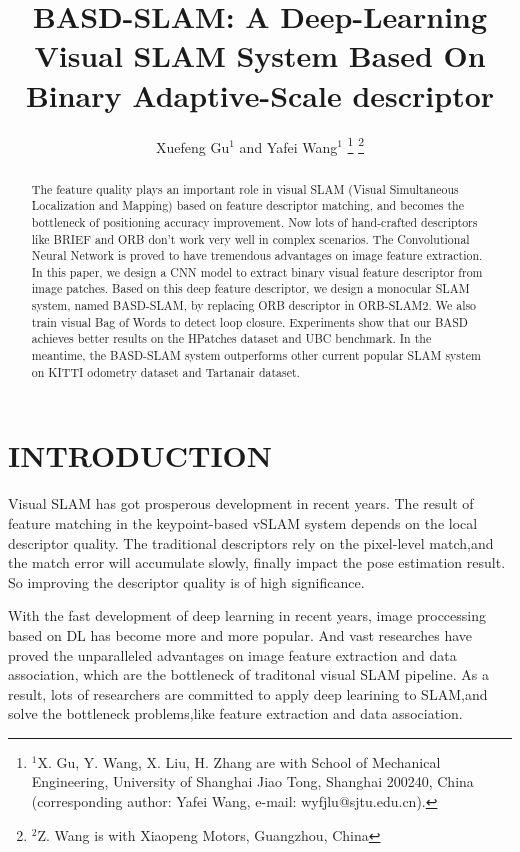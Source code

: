 \documentclass[letterpaper, 10 pt, conference]{ieeeconf}  %
\title{\LARGE \bf
BASD-SLAM: A Deep-Learning Visual SLAM System Based On Binary Adaptive-Scale descriptor
}
\author{Xuefeng Gu$^{1}$ and Yafei Wang$^{1}$ %
\thanks{$^{1}$X. Gu,  Y. Wang, X. Liu, H. Zhang are with School of Mechanical Engineering, University of Shanghai Jiao Tong, Shanghai 200240,
China (corresponding author: Yafei Wang, e-mail: wyfjlu@sjtu.edu.cn).
}
\thanks{
$^{2}$Z. Wang is with Xiaopeng Motors, Guangzhou, China}
%
}
\begin{document}
\maketitle
\thispagestyle{empty}
\pagestyle{empty}


\begin{abstract}

The feature quality plays an important role in visual SLAM (Visual Simultaneous Localization and Mapping) based on feature descriptor matching, and becomes the bottleneck of positioning accuracy improvement. Now lots of hand-crafted descriptors like BRIEF and ORB don't work very well in complex scenarios. The Convolutional Neural Network is proved to have tremendous advantages on image feature extraction. In this paper, we design a CNN model to extract binary visual feature descriptor from image patches. Based on this deep feature descriptor, we design a monocular SLAM system, named BASD-SLAM, by replacing ORB descriptor in ORB-SLAM2. We also train visual Bag of Words to detect loop closure. Experiments show that our BASD achieves better results on the HPatches dataset and UBC benchmark. In the meantime, the BASD-SLAM system outperforms other current popular SLAM system on KITTI odometry dataset and Tartanair dataset.

\end{abstract}


\section{INTRODUCTION}

Visual SLAM has got prosperous development in recent years. The result of feature matching in the keypoint-based vSLAM system depends on the local descriptor quality. The traditional descriptors rely on the pixel-level match,and the match error will accumulate slowly, finally impact the pose estimation result. So improving the descriptor quality is of high significance.

With the fast development of deep learning in recent years,  image proccessing based on DL has become more and more popular. And vast researches have proved the unparalleled advantages on image feature extraction and data association, which are the bottleneck of traditonal visual SLAM pipeline. As a result, lots of researchers are committed to apply deep learining to SLAM,and solve the bottleneck problems,like feature extraction and data association.
\end{document}
